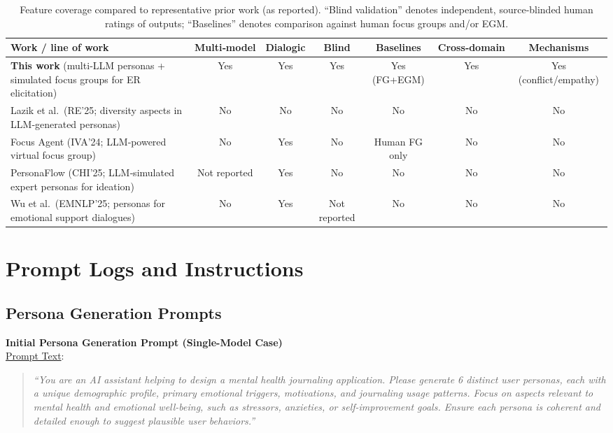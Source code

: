 \documentclass[acmsmall]{acmart}
\begin{document}
\begin{table}[h!]
  \centering
  \caption{Feature coverage compared to representative prior work (as reported). ``Blind validation'' denotes independent, source‑blinded human ratings of outputs; ``Baselines'' denotes comparison against human focus groups and/or EGM.}
  \label{tab:priorwork-compare}
  \scriptsize
  \setlength{\tabcolsep}{3.5pt}
  \begin{tabular}{@{}p{3.5cm}cccccc@{}}
    \toprule
    \textbf{Work / line of work} & \textbf{Multi‑model} & \textbf{Dialogic} & \textbf{Blind} & \textbf{Baselines} & \textbf{Cross‑domain} & \textbf{Mechanisms} \\
    \midrule
    \textbf{This work} (multi‑LLM personas + simulated focus groups for ER elicitation) & Yes & Yes & Yes & Yes (FG+EGM) & Yes & Yes (conflict/empathy) \\
    Lazik et al.\ (RE'25; diversity aspects in LLM‑generated personas) & No & No & No & No & No & No \\
    Focus Agent (IVA'24; LLM‑powered virtual focus group) & No & Yes & No & Human FG only & No & No \\
    PersonaFlow (CHI'25; LLM‑simulated expert personas for ideation) & Not reported & Yes & No & No & No & No \\
    Wu et al.\ (EMNLP'25; personas for emotional support dialogues) & No & Yes & Not reported & No & No & No \\
    \bottomrule
  \end{tabular}
\end{table}
\section{Prompt Logs and Instructions}


\subsection{Persona Generation Prompts}

\noindent\textbf{Initial Persona Generation Prompt (Single-Model Case)}\\
\underline{Prompt Text}: 
\begin{quote}
\emph{``You are an AI assistant helping to design a mental health journaling application. 
Please generate 6 distinct user personas, each with a unique demographic profile, primary emotional triggers, motivations, and journaling usage patterns. 
Focus on aspects relevant to mental health and emotional well-being, such as stressors, anxieties, or self-improvement goals. 
Ensure each persona is coherent and detailed enough to suggest plausible user behaviors.''}
\end{quote}
\end{document}
